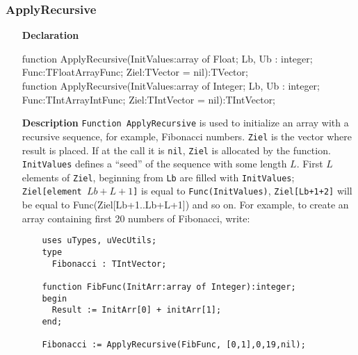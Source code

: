 \documentclass[12pt,a4paper,oneside]{report}
\newcommand{\declarationitem}[1]{\textbf{#1}}
\newcommand{\descriptiontitle}[1]{\textbf{#1}}
\newcommand{\code}[1]{\texttt{#1}}
\begin{document}
\subsubsection{ApplyRecursive}
\label{sub:Applyrecursive}
\begin{itemize}
	\item[\declarationitem{Declaration}\hfill]
	\begin{flushleft}
function ApplyRecursive(InitValues:array of Float;
Lb, Ub : integer; Func:TFloatArrayFunc; Ziel:TVector = nil):TVector;\\

function ApplyRecursive(InitValues:array of Integer;
Lb, Ub : integer; Func:TIntArrayIntFunc; Ziel:TIntVector = nil):TIntVector;\\
	\end{flushleft}
	\item[\descriptiontitle{Description}] \code{Function ApplyRecursive} is used to initialize an array with a recursive sequence, for example, Fibonacci numbers. \code{Ziel} is the vector where result is placed. If at the call it is \code{nil}, \code{Ziel} is allocated by the function. \code{InitValues} defines a ``seed'' of the sequence with some length $L$. First $L$ elements of \code{Ziel}, beginning from \code{Lb} are filled with \code{InitValues}; \code{Ziel[element $Lb+L+1$]} is equal to \code{Func(InitValues)},  \code{Ziel[Lb+1+2]} will be equal to Func(Ziel[Lb+1..Lb+L+1]) and so on. For example, to create an array containing first 20 numbers of Fibonacci, write:
	\begin{verbatim}
	uses uTypes, uVecUtils;	
	type
	  Fibonacci : TIntVector;
	
	function FibFunc(InitArr:array of Integer):integer;
	begin
	  Result := InitArr[0] + initArr[1];
	end;
	
	Fibonacci := ApplyRecursive(FibFunc, [0,1],0,19,nil);
	\end{verbatim}  
\end{itemize}	
\end{document}

